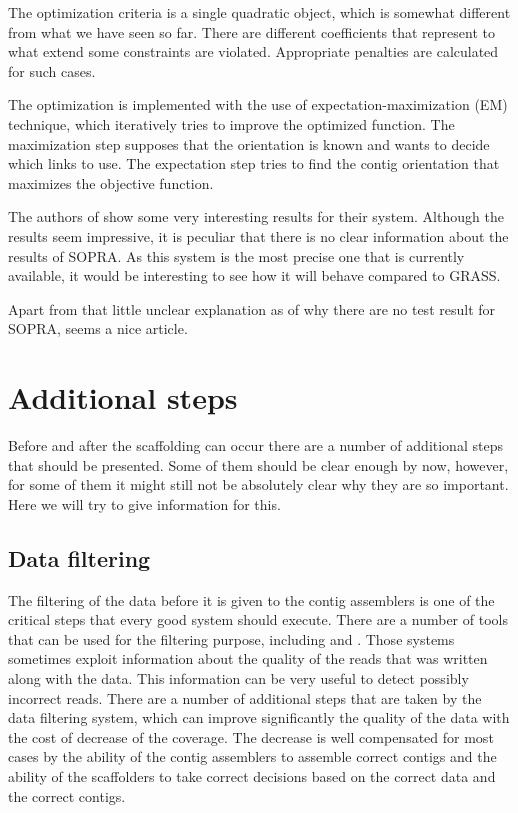 \documentclass[11pt]{article}
\begin{document}
The optimization criteria is a single quadratic object, which is somewhat
different from what we have seen so far. There are different coefficients that
represent to what extend some constraints are violated. Appropriate penalties
are calculated for such cases.

The optimization is implemented with the use of expectation-maximization (EM)
technique, which iteratively tries to improve the optimized function. The
maximization step supposes that the orientation is known and wants to decide
which links to use. The expectation step tries to find the contig orientation
that maximizes the objective function.

The authors of \cite{grass} show some very interesting results for their system.
Although the results seem impressive, it is peculiar that there is no clear
information about the results of SOPRA. As this system is the most precise one
that is currently available, it would be interesting to see how it will behave
compared to GRASS.

Apart from that little unclear explanation as of why there are no test result
for SOPRA, \cite{grass} seems a nice article.



\section{Additional steps} %
\label{sec:Additional steps}
Before and after the scaffolding can occur there are a number of additional
steps that should be presented. Some of them should be clear enough by now,
however, for some of them it might still not be absolutely clear why they are so
important. Here we will try to give information for this.

\subsection{Data filtering} %
\label{sub:Data filtering}
The filtering of the data before it is given to the contig assemblers is one of
the critical steps that every good system should execute. There are a number of
tools that can be used for the filtering purpose, including \cite{quake} and
\cite{filtering-solid}. Those systems sometimes exploit information about the
quality of the reads that was written along with the data. This information can
be very useful to detect possibly incorrect reads. There are a number of
additional steps that are taken by the data filtering system, which can improve
significantly the quality of the data with the cost of decrease of the coverage.
The decrease is well compensated for most cases by the ability of the contig
assemblers to assemble correct contigs and the ability of the scaffolders to
take correct decisions based on the correct data and the correct contigs. 
\end{document}
